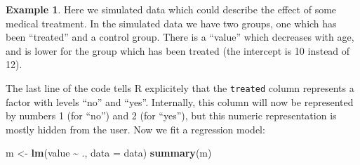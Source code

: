 \documentclass[
  a4paper,
]{article}
\newenvironment{Shaded}{\begin{snugshade}}{\end{snugshade}}
\newcommand{\AttributeTok}[1]{\textcolor[rgb]{0.13,0.29,0.53}{#1}}
\newcommand{\DecValTok}[1]{\textcolor[rgb]{0.00,0.00,0.81}{#1}}
\newcommand{\FloatTok}[1]{\textcolor[rgb]{0.00,0.00,0.81}{#1}}
\newcommand{\FunctionTok}[1]{\textcolor[rgb]{0.13,0.29,0.53}{\textbf{#1}}}
\newcommand{\NormalTok}[1]{#1}
\newcommand{\OtherTok}[1]{\textcolor[rgb]{0.56,0.35,0.01}{#1}}
\newcommand{\SpecialCharTok}[1]{\textcolor[rgb]{0.81,0.36,0.00}{\textbf{#1}}}
\newcommand{\StringTok}[1]{\textcolor[rgb]{0.31,0.60,0.02}{#1}}
\theoremstyle{definition}
\theoremstyle{definition}
\newtheorem{example}{Example}[section]
\theoremstyle{definition}
\theoremstyle{definition}
\theoremstyle{remark}
\begin{document}
\begin{example}
Here we simulated data which could describe the effect of some
medical treatment.
In the simulated data we have two groups, one which has been ``treated''
and a control group. There is a ``value'' which decreases with age,
and is lower for the group which has been treated (the intercept is 10
instead of 12).

\begin{Shaded}
\end{Shaded}

The last line of the code tells R explicitely that the \texttt{treated} column
represents a factor with levels ``no'' and ``yes''. Internally, this column will
now be represented by numbers 1 (for ``no'') and 2 (for ``yes''), but this numeric representation
is mostly hidden from the user. Now we fit a regression model:

\begin{Shaded}
\begin{Highlighting}[]
\NormalTok{m }\OtherTok{\textless{}{-}} \FunctionTok{lm}\NormalTok{(value }\SpecialCharTok{\textasciitilde{}}\NormalTok{ ., }\AttributeTok{data =}\NormalTok{ data)}
\FunctionTok{summary}\NormalTok{(m)}
\end{Highlighting}
\end{Shaded}


\end{example}
\end{document}
